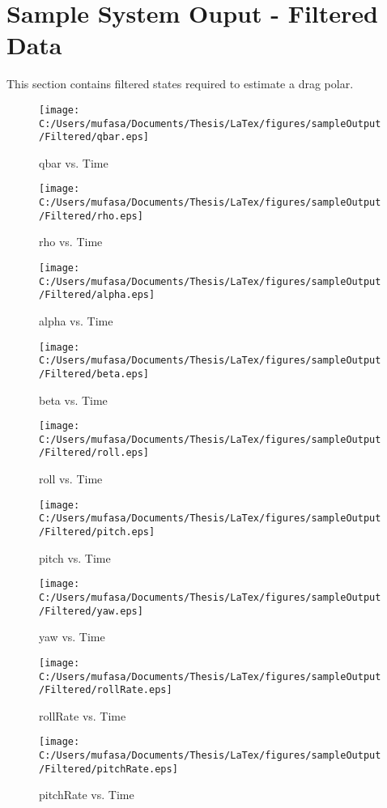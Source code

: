 \section{Sample System Ouput - Filtered Data}
This section contains filtered states required to estimate a drag polar.
\begin{figure}[]
	\centering
	\caption{qbar vs. Time}
		\texttt{[image: C:/Users/mufasa/Documents/Thesis/LaTex/figures/sampleOutput/Filtered/qbar.eps]}
\end{figure}
\begin{figure}[]
	\centering
	\caption{rho vs. Time}
		\texttt{[image: C:/Users/mufasa/Documents/Thesis/LaTex/figures/sampleOutput/Filtered/rho.eps]}
\end{figure}
\clearpage
\begin{figure}[]
	\centering
	\caption{alpha vs. Time}
		\texttt{[image: C:/Users/mufasa/Documents/Thesis/LaTex/figures/sampleOutput/Filtered/alpha.eps]}
\end{figure}
\begin{figure}[]
	\centering
	\caption{beta vs. Time}
		\texttt{[image: C:/Users/mufasa/Documents/Thesis/LaTex/figures/sampleOutput/Filtered/beta.eps]}
\end{figure}
\begin{figure}[]
	\centering
	\caption{roll vs. Time}
		\texttt{[image: C:/Users/mufasa/Documents/Thesis/LaTex/figures/sampleOutput/Filtered/roll.eps]}
\end{figure}
\begin{figure}[]
	\centering
	\caption{pitch vs. Time}
		\texttt{[image: C:/Users/mufasa/Documents/Thesis/LaTex/figures/sampleOutput/Filtered/pitch.eps]}
\end{figure}
\begin{figure}[]
	\centering
	\caption{yaw vs. Time}
		\texttt{[image: C:/Users/mufasa/Documents/Thesis/LaTex/figures/sampleOutput/Filtered/yaw.eps]}
\end{figure}
\begin{figure}[]
	\centering
	\caption{rollRate vs. Time}
		\texttt{[image: C:/Users/mufasa/Documents/Thesis/LaTex/figures/sampleOutput/Filtered/rollRate.eps]}
\end{figure}
\begin{figure}[]
	\centering
	\caption{pitchRate vs. Time}
		\texttt{[image: C:/Users/mufasa/Documents/Thesis/LaTex/figures/sampleOutput/Filtered/pitchRate.eps]}
\end{figure}
